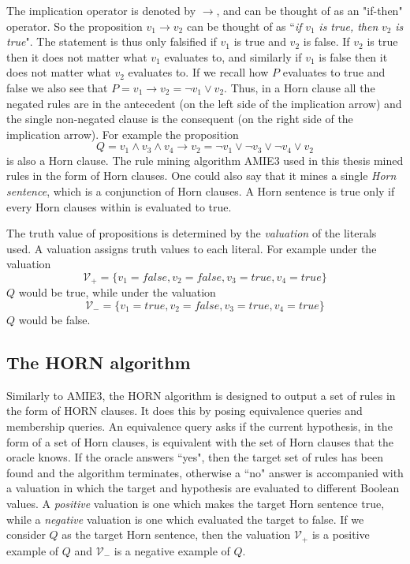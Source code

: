 The implication operator is denoted by $\rightarrow$, and can be thought of as an "if-then" operator. So the proposition $v_1 \rightarrow v_2$ can be thought of as ``\textit{if} $v_1$\textit{ is true, then }$v_2$ \textit{is true}". The statement is thus only falsified if $v_1$ is true and $v_2$ is false. If $v_2$ is true then it does not matter what $v_1$ evaluates to, and similarly if $v_1$ is false then it does not matter what $v_2$ evaluates to. If we recall how $P$ evaluates to true and false we also see that $P = v_1 \rightarrow v_2 = \neg v_1 \vee v_2$. 
Thus, in a Horn clause all the negated rules are in the antecedent (on the left side of the implication arrow) and the single non-negated clause is the consequent (on the right side of the implication arrow). For example the proposition \[Q = v_1 \wedge v_3 \wedge v_4\rightarrow v_2 = \neg v_1 \vee \neg v_3 \vee \neg v_4\vee v_2\] is also a Horn clause. The rule mining algorithm AMIE3 used in this thesis mined rules in the form of Horn clauses. One could also say that it mines a single \textit{Horn sentence}, which is a conjunction of Horn clauses. A Horn sentence is true only if every Horn clauses within is evaluated to true.

The truth value of propositions is determined by the \textit{valuation} of the literals used. A valuation assigns truth values to each literal. For example under the valuation \[\mathcal{V_{+}}=\{v_1 = false, v_2 = false, v_3 = true, v_4 = true\}\] $Q$ would be true, while under the valuation \[\mathcal{V_{-}}=\{v_1 = true, v_2 = false, v_3 = true, v_4 = true\}\] $Q$ would be false.

\subsection{The HORN algorithm}
Similarly to AMIE3, the HORN algorithm is designed to output a set of rules in the form of HORN clauses. It does this by posing equivalence queries and membership queries. An equivalence query asks if the current hypothesis, in the form of a set of Horn clauses, is equivalent with the set of Horn clauses that the oracle knows. If the oracle answers ``yes", then the target set of rules has been found and the algorithm terminates, otherwise a ``no" answer is accompanied with a valuation in which the target and hypothesis are evaluated to different Boolean values. A \textit{positive} valuation is one which makes the target Horn sentence true, while a \textit{negative} valuation is one which evaluated the target to false. If we consider $Q$ as the target Horn sentence, then the valuation $\mathcal{V}_{+}$ is a positive example of $Q$ and $\mathcal{V}_{-}$ is a negative example of $Q$.

